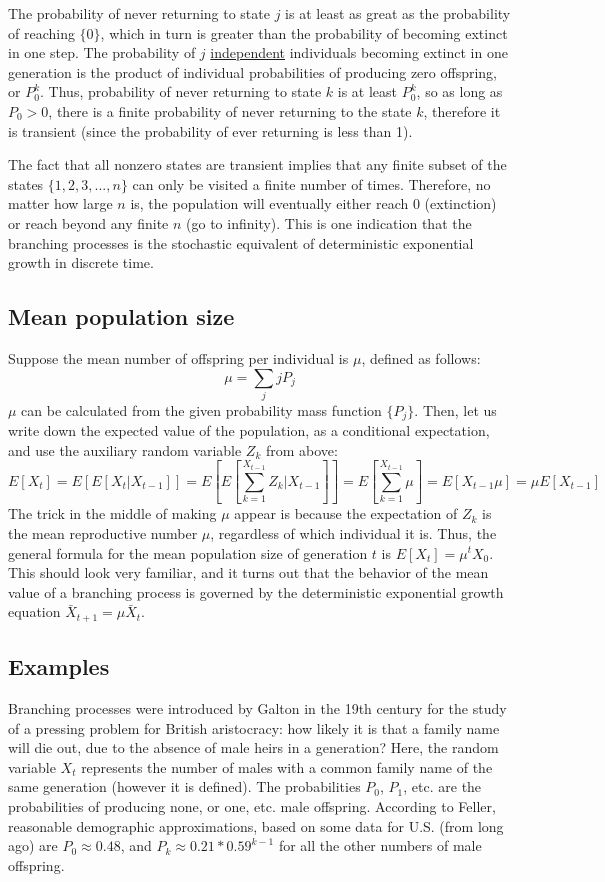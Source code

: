\documentclass[11pt]{book}
\begin{document}
The probability of never returning to state $j$ is at least as great as the probability of reaching $\{0\}$, which in turn is greater than the probability of becoming extinct in one step. The probability of $j$ \underline{independent} individuals becoming extinct in one generation is the product of individual probabilities of producing zero offspring, or $P_0^k$. Thus, probability of never returning to state $k$ is at least $P_0^k$, so as long as $P_0 > 0$, there is a finite probability of never returning to the state $k$, therefore it is transient (since the probability of ever returning is less than 1).

The fact that all nonzero states are transient implies that any finite subset of the states $\{ 1, 2, 3, ... , n\}$ can only be visited a finite number of times. Therefore, no matter how large $n$ is, the population will eventually either reach $0$ (extinction) or reach beyond any finite $n$ (go to infinity). This is one indication that the branching processes is the stochastic equivalent of deterministic exponential growth in discrete time.

\subsection{Mean population size}
Suppose the mean number of offspring per individual is $\mu$, defined as follows:
$$ \mu = \sum_j j P_j$$
$\mu$ can be calculated from the given probability mass function $\{ P_j \}$. Then, let us write down the expected value of the population, as a conditional expectation, and use the auxiliary random variable $Z_k$ from above:
$$ E[X_t] = E [ E[ X_t | X_{t-1}] ] = E [ E \left[ \sum_{k=1}^{X_{t-1}} Z_k | X_{t-1}\right]] = E [  \sum_{k=1}^{X_{t-1}} \mu] = E [ X_{t-1} \mu]  = \mu  E [ X_{t-1}]$$
The trick in the middle of making $\mu$ appear is because the expectation of $Z_k$ is the mean reproductive number $\mu$, regardless of which individual it is.
Thus, the general formula for the mean population size of generation $t$ is $E[X_t] = \mu^t X_0$. This should look very familiar, and it turns out that the behavior of the mean value of a branching process is governed by the deterministic exponential growth equation $\bar X_{t+1} = \mu \bar X_t$.

\subsection{Examples}
Branching processes were introduced by Galton in the 19th century for the study of a pressing problem for British aristocracy: how likely it is that a family name will die out, due to the absence of male heirs in a generation? Here, the random variable $X_t$ represents the number of males with a common family name of the same generation (however it is defined). The probabilities $P_0$, $P_1$, etc. are the probabilities of producing none, or one, etc. male offspring. According to Feller, reasonable demographic approximations, based on some data for U.S. (from long ago) are $P_0 \approx 0.48$, and $P_k \approx  0.21 * 0.59^{k-1}$ for all the other numbers of male offspring.
\end{document}
